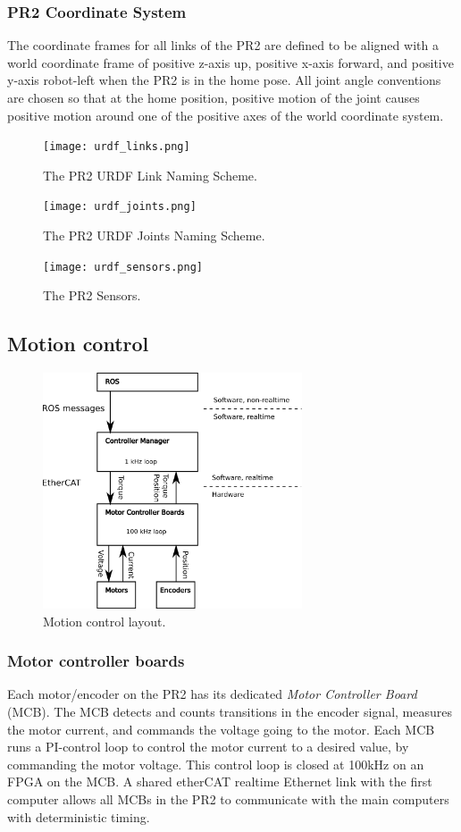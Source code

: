 \subsubsection{PR2 Coordinate System}
\label{sec:pr2_coordinate_system}
The coordinate frames for all links of the PR2 are defined to be aligned with
 a world coordinate frame of positive z-axis up, positive x-axis forward, and
positive y-axis robot-left when the PR2 is in the home pose.  All joint angle conventions
are chosen so that at the home position, positive motion of the joint causes positive
motion around one of the positive axes of the world coordinate system.

\begin{figure}[!h]
\centering
\texttt{[image: urdf\_links.png]}
\caption{The PR2 URDF Link Naming Scheme.}
\label{fig:urdf_link_names}
\texttt{[image: urdf\_joints.png]}
\caption{The PR2 URDF Joints Naming Scheme.}
\label{fig:urdf_joints}
\texttt{[image: urdf\_sensors.png]}
\caption{The PR2 Sensors.}
\label{fig:urdf_sensor}
\end{figure}

\subsection{Motion control}

\begin{figure}[ht]
\centering
\includegraphics[width=290px]{images/mechanism_control.png}
\caption{Motion control layout.}
\label{fig:motion_control}
\end{figure}


\subsubsection{Motor controller boards}
Each motor/encoder on the PR2 has its dedicated \emph{Motor Controller Board}
(MCB). The MCB detects and counts transitions in the encoder signal, measures
the motor current, and commands the voltage going to the motor. Each MCB runs a
PI-control loop to control the motor current to a desired value, by commanding
the motor voltage. This control loop is closed at 100kHz on an FPGA on the MCB.  A
shared etherCAT realtime Ethernet link with the first computer allows all MCBs
 in the PR2 to communicate with the main computers with deterministic timing.

